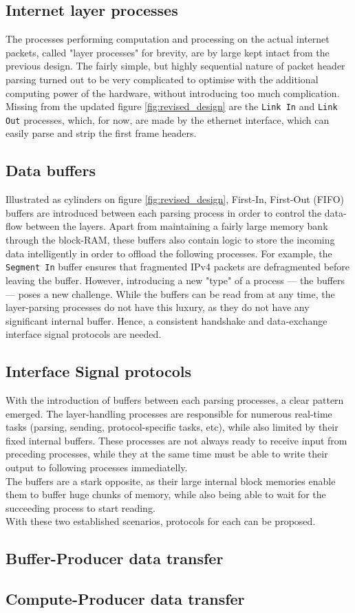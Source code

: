 \subsection{Internet layer processes} \label{sec:layer_processes}
The processes performing computation and processing on the actual internet 
packets, called "layer processes" for brevity, are by large kept intact from the 
previous design. The fairly simple, but highly sequential nature of packet 
header parsing turned out to be very complicated to optimise with the additional
computing power of the hardware, without introducing too much complication.\\
Missing from the updated figure \ref{fig:revised_design} are the \texttt{Link In}
and \texttt{Link Out} processes, which, for now, are made by the ethernet 
interface, which can easily parse and strip the first frame headers.


\subsection{Data buffers} \label{sec:data_buffers}
Illustrated as cylinders on figure \ref{fig:revised_design}, First-In, First-Out (FIFO)
buffers are introduced between each parsing process in order to control the data-flow 
between the layers. Apart from maintaining a fairly large memory bank through 
the block-RAM, these buffers also contain logic to store the incoming data
intelligently in order to offload the following processes. For example, the
\texttt{Segment In} buffer ensures that fragmented IPv4 packets are defragmented
before leaving the buffer.
However, introducing a new "type" of a process --- the buffers --- poses a new 
challenge. While the buffers can be read from at any time, the layer-parsing
processes do not have this luxury, as they do not have any significant internal
buffer. Hence, a consistent handshake and data-exchange interface signal protocols
are needed.

\subsection{Interface Signal protocols}
With the introduction of buffers between each parsing processes, a clear pattern
emerged. The layer-handling processes are responsible for numerous real-time tasks 
(parsing, sending, protocol-specific tasks, etc), while also limited by their 
fixed internal buffers. These processes are not always ready to receive input 
from preceding processes, while they at the same time must be able to write their
output to following processes immediatelly.\\
The buffers are a stark opposite, as their large internal block memories enable
them to buffer huge chunks of memory, while also being able to wait for the 
succeeding process to start reading.\\
With these two established scenarios, protocols for each can be proposed.  

\subsection{Buffer-Producer data transfer}

\subsection{Compute-Producer data transfer}


